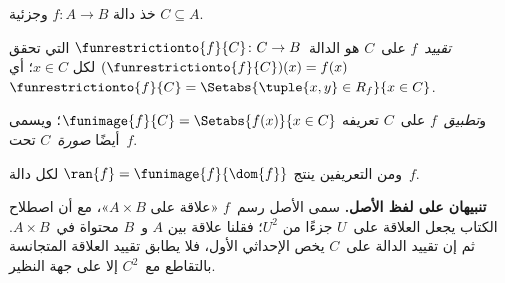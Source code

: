 \documentclass[../../../include/open-logic-section]{subfiles}
\begin{document}
\begin{defn}
خذ دالة $f \colon A \to B$ وجزئية $C\subseteq A$.

\emph{تقييد}~$f$ على~$C$ هو الدالة~$\funrestrictionto{f}{C}\colon C \to B$
التي تحقق $(\funrestrictionto{f}{C})(x) = f(x)$ لكل $x \in C$؛ أي
$\funrestrictionto{f}{C} = \Setabs{\tuple{x, y} \in R_f}{x \in
C}$.

و\emph{تطبيق}~$f$ على~$C$ تعريفه $\funimage{f}{C} =
\Setabs{f(x)}{x \in C}$؛ ويسمى أيضًا \emph{صورة}~$C$ تحت~$f$.
\end{defn}

\begin{explain}
ومن التعريفين ينتج $\ran{f} =
\funimage{f}{\dom{f}}$ لكل دالة~$f$.
\end{explain}

\begin{explain}
\textbf{تنبيهان على لفظ الأصل.} سمى الأصل رسم~$f$ «علاقة على
$A\times B$»، مع أن اصطلاح الكتاب يجعل العلاقة على~$U$ جزءًا من
$U^2$؛ فقلنا علاقة بين $A$ و~$B$ محتواة في~$A\times B$. ثم إن
تقييد الدالة على~$C$ يخص الإحداثي الأول، فلا يطابق تقييد العلاقة
المتجانسة بالتقاطع مع~$C^2$ إلا على جهة النظير.
\end{explain}
\end{document}
